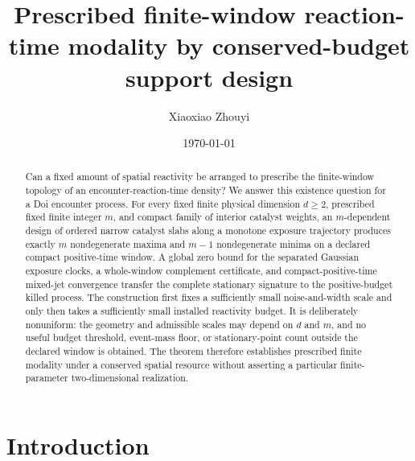 \documentclass{iopjournal}
\date{\today}
\theoremstyle{plain}
\theoremstyle{definition}
\begin{document}

\title{Prescribed finite-window reaction-time modality by conserved-budget
support design}

\author{Xiaoxiao Zhouyi}




\begin{abstract}
Can a fixed amount of spatial reactivity be arranged to prescribe the
finite-window topology of an encounter-reaction-time density?  We answer this
existence question for a Doi encounter process.  For every fixed finite
physical dimension \(d\ge2\), prescribed fixed finite integer \(m\), and
compact family of interior catalyst weights, an \(m\)-dependent design of
ordered narrow catalyst slabs along a monotone exposure trajectory produces
exactly \(m\) nondegenerate maxima and \(m-1\) nondegenerate minima on a
declared compact positive-time window.  A global zero bound for the separated
Gaussian exposure clocks, a whole-window complement certificate, and
compact-positive-time mixed-jet convergence transfer the complete stationary
signature to the positive-budget killed process.  The construction first
fixes a sufficiently small noise-and-width scale and only then takes a
sufficiently small installed reactivity budget.  It is deliberately
nonuniform: the geometry and admissible scales may depend on \(d\) and \(m\),
and no useful budget threshold, event-mass floor, or stationary-point count
outside the declared window is obtained.  The theorem therefore establishes
prescribed finite modality under a conserved spatial resource without
asserting a particular finite-parameter two-dimensional realization.
\end{abstract}

\vspace{3mm}
\vspace{2mm} %

\section{Introduction}
\label{sec:introduction}
\end{document}
